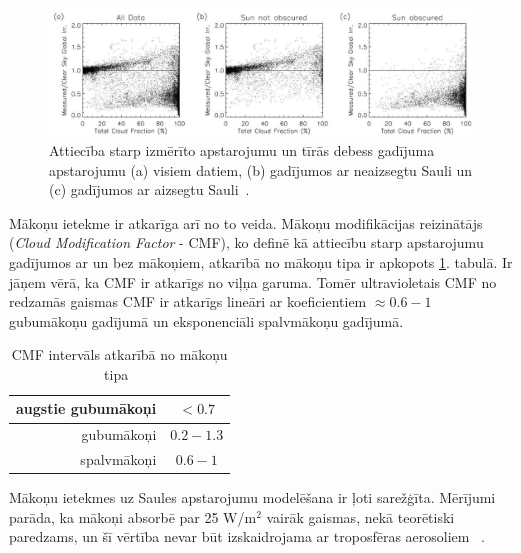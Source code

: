 \begin{figure}[h]
	\centering
	\includegraphics[width=\linewidth]{figures/misc/makoni_ietekme.jpg}
	\caption{Attiecība starp izmērīto apstarojumu un tīrās debess gadījuma apstarojumu (a) visiem datiem, (b) gadījumos ar neaizsegtu Sauli un (c) gadījumos ar aizsegtu Sauli~\cite{CloudCoverageImpactOnIrradiance}.}
	\label{fig:makoni_ietekme}
\end{figure}

Mākoņu ietekme ir atkarīga arī no to veida. Mākoņu modifikācijas reizinātājs (\textit{Cloud Modification Factor} - CMF), ko definē kā attiecību starp apstarojumu gadījumos ar un bez mākoņiem, atkarībā no mākoņu tipa ir apkopots \ref{tab:CMF}. tabulā. Ir jāņem vērā, ka CMF ir atkarīgs no viļņa garuma. Tomēr ultravioletais CMF no redzamās gaismas CMF ir atkarīgs lineāri ar koeficientiem $\approx0.6-1$ gubumākoņu gadījumā un eksponenciāli spalvmākoņu gadījumā.
\begin{table}[h]
	\caption{CMF intervāls atkarībā no mākoņu tipa~\cite{effectCloudsOnSurface}}
	\begin{center}
		\begin{tabular}{| r | c |}
			\hline
			augstie gubumākoņi & $<0.7$     \\ \hline
			gubumākoņi         & $0.2-1.3$ \\ \hline
			spalvmākoņi        & $0.6-1$    \\ \hline
		\end{tabular}
	\end{center}
	\label{tab:CMF}
\end{table}

Mākoņu ietekmes uz Saules apstarojumu modelēšana ir ļoti sarežģīta. Mērījumi parāda, ka mākoņi absorbē par 25 W/m$^2$ vairāk gaismas, nekā teorētiski paredzams, un šī vērtība nevar būt izskaidrojama ar troposfēras aerosoliem ~\cite{observVSModel}.

